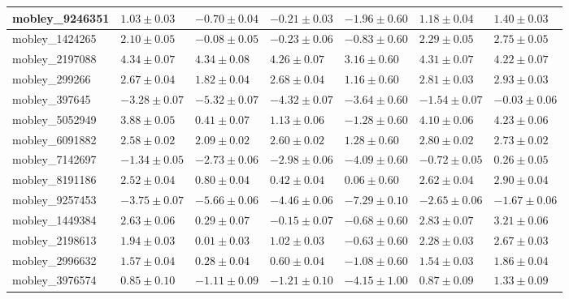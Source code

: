 \documentclass{article}
\begin{document}
\begin{landscape}
\begin{longtable}{|l{3.0cm}|l{3.0cm}|l{3.2cm}|l{3.6cm}|l{3.0cm}|l{3.0cm}|l{3.0cm}|}
mobley\_9246351	&	$	1.03	\pm	0.03	$	&	$	-0.70	\pm	0.04	$	&	$	-0.21	\pm	0.03	$	&	$	-1.96	\pm	0.60	$	&	$	1.18	\pm	0.04	$	&	$	1.40	\pm	0.03	$	\\ \hline
mobley\_1424265	&	$	2.10	\pm	0.05	$	&	$	-0.08	\pm	0.05	$	&	$	-0.23	\pm	0.06	$	&	$	-0.83	\pm	0.60	$	&	$	2.29	\pm	0.05	$	&	$	2.75	\pm	0.05	$	\\ \hline
mobley\_2197088	&	$	4.34	\pm	0.07	$	&	$	4.34	\pm	0.08	$	&	$	4.26	\pm	0.07	$	&	$	3.16	\pm	0.60	$	&	$	4.31	\pm	0.07	$	&	$	4.22	\pm	0.07	$	\\ \hline
mobley\_299266	&	$	2.67	\pm	0.04	$	&	$	1.82	\pm	0.04	$	&	$	2.68	\pm	0.04	$	&	$	1.16	\pm	0.60	$	&	$	2.81	\pm	0.03	$	&	$	2.93	\pm	0.03	$	\\ \hline
mobley\_397645	&	$	-3.28	\pm	0.07	$	&	$	-5.32	\pm	0.07	$	&	$	-4.32	\pm	0.07	$	&	$	-3.64	\pm	0.60	$	&	$	-1.54	\pm	0.07	$	&	$	-0.03	\pm	0.06	$	\\ \hline
mobley\_5052949	&	$	3.88	\pm	0.05	$	&	$	0.41	\pm	0.07	$	&	$	1.13	\pm	0.06	$	&	$	-1.28	\pm	0.60	$	&	$	4.10	\pm	0.06	$	&	$	4.23	\pm	0.06	$	\\ \hline
mobley\_6091882	&	$	2.58	\pm	0.02	$	&	$	2.09	\pm	0.02	$	&	$	2.60	\pm	0.02	$	&	$	1.28	\pm	0.60	$	&	$	2.80	\pm	0.02	$	&	$	2.73	\pm	0.02	$	\\ \hline
mobley\_7142697	&	$	-1.34	\pm	0.05	$	&	$	-2.73	\pm	0.06	$	&	$	-2.98	\pm	0.06	$	&	$	-4.09	\pm	0.60	$	&	$	-0.72	\pm	0.05	$	&	$	0.26	\pm	0.05	$	\\ \hline
mobley\_8191186	&	$	2.52	\pm	0.04	$	&	$	0.80	\pm	0.04	$	&	$	0.42	\pm	0.04	$	&	$	0.06	\pm	0.60	$	&	$	2.62	\pm	0.04	$	&	$	2.90	\pm	0.04	$	\\ \hline
mobley\_9257453	&	$	-3.75	\pm	0.07	$	&	$	-5.66	\pm	0.06	$	&	$	-4.46	\pm	0.06	$	&	$	-7.29	\pm	0.10	$	&	$	-2.65	\pm	0.06	$	&	$	-1.67	\pm	0.06	$	\\ \hline
mobley\_1449384	&	$	2.63	\pm	0.06	$	&	$	0.29	\pm	0.07	$	&	$	-0.15	\pm	0.07	$	&	$	-0.68	\pm	0.60	$	&	$	2.83	\pm	0.07	$	&	$	3.21	\pm	0.06	$	\\ \hline
mobley\_2198613	&	$	1.94	\pm	0.03	$	&	$	0.01	\pm	0.03	$	&	$	1.02	\pm	0.03	$	&	$	-0.63	\pm	0.60	$	&	$	2.28	\pm	0.03	$	&	$	2.67	\pm	0.03	$	\\ \hline
mobley\_2996632	&	$	1.57	\pm	0.04	$	&	$	0.28	\pm	0.04	$	&	$	0.60	\pm	0.04	$	&	$	-1.08	\pm	0.60	$	&	$	1.54	\pm	0.03	$	&	$	1.86	\pm	0.04	$	\\ \hline
mobley\_3976574	&	$	0.85	\pm	0.10	$	&	$	-1.11	\pm	0.09	$	&	$	-1.21	\pm	0.10	$	&	$	-4.15	\pm	1.00	$	&	$	0.87	\pm	0.09	$	&	$	1.33	\pm	0.09	$	\\ \hline

\end{longtable}
\end{landscape}
\end{document}
